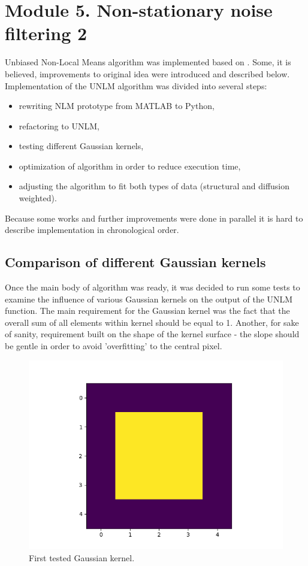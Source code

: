 \section{Module 5. Non-stationary noise filtering 2}

Unbiased Non-Local Means algorithm was implemented based on \cite{5a1}. Some, it is believed, improvements to original idea were introduced and described below. Implementation of the UNLM algorithm was divided into several steps:
\begin{itemize}
	\item rewriting NLM prototype from MATLAB to Python,
	\item refactoring to UNLM,
	\item testing different Gaussian kernels,
	\item optimization of algorithm in order to reduce execution time,
	\item adjusting the algorithm to fit both types of data (structural and diffusion weighted).
\end{itemize}
Because some works and further improvements were done in parallel it is hard to describe implementation in chronological order.

\subsection*{Comparison of different Gaussian kernels}
Once the main body of algorithm was ready, it was decided to run some tests to examine the influence of various Gaussian kernels on the output of the UNLM function. The main requirement for the Gaussian kernel was the fact that the overall sum of all elements within kernel should be equal to 1. Another, for sake of sanity, requirement built on the shape of the kernel surface - the slope should be gentle in order to avoid 'overfitting' to the central pixel.

\begin{figure}[H]
\centering{}
\includegraphics[scale=0.7]{figures/module05/gk1}
\caption{First tested Gaussian kernel.} 
\end{figure}

